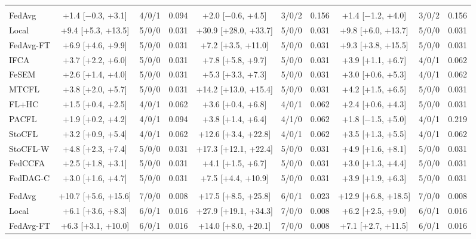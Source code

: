 {\begin{tabular}{l c c c c c c c c c}
\addlinespace
\multicolumn{10}{l}{\textit{(b) Realistic benchmarks}} \\
FedAvg & +1.4 [$-$0.3, +3.1] & 4/0/1 & 0.094 & +2.0 [$-$0.6, +4.5] & 3/0/2 & 0.156 & +1.4 [$-$1.2, +4.0] & 3/0/2 & 0.156 \\
Local & +9.4 [+5.3, +13.5] & 5/0/0 & 0.031 & +30.9 [+28.0, +33.7] & 5/0/0 & 0.031 & +9.8 [+6.0, +13.7] & 5/0/0 & 0.031 \\
FedAvg-FT & +6.9 [+4.6, +9.9] & 5/0/0 & 0.031 & +7.2 [+3.5, +11.0] & 5/0/0 & 0.031 & +9.3 [+3.8, +15.5] & 5/0/0 & 0.031 \\
IFCA & +3.7 [+2.2, +6.0] & 5/0/0 & 0.031 & +7.8 [+5.8, +9.7] & 5/0/0 & 0.031 & +3.9 [+1.1, +6.7] & 4/0/1 & 0.062 \\
FeSEM & +2.6 [+1.4, +4.0] & 5/0/0 & 0.031 & +5.3 [+3.3, +7.3] & 5/0/0 & 0.031 & +3.0 [+0.6, +5.3] & 4/0/1 & 0.062 \\
MTCFL & +3.8 [+2.0, +5.7] & 5/0/0 & 0.031 & +14.2 [+13.0, +15.4] & 5/0/0 & 0.031 & +4.2 [+1.5, +6.5] & 5/0/0 & 0.031 \\
FL+HC & +1.5 [+0.4, +2.5] & 4/0/1 & 0.062 & +3.6 [+0.4, +6.8] & 4/0/1 & 0.062 & +2.4 [+0.6, +4.3] & 5/0/0 & 0.031 \\
PACFL & +1.9 [+0.2, +4.2] & 4/0/1 & 0.094 & +3.8 [+1.4, +6.4] & 4/1/0 & 0.062 & +1.8 [$-$1.5, +5.0] & 4/0/1 & 0.219 \\
StoCFL & +3.2 [+0.9, +5.4] & 4/0/1 & 0.062 & +12.6 [+3.4, +22.8] & 4/0/1 & 0.062 & +3.5 [+1.3, +5.5] & 4/0/1 & 0.062 \\
StoCFL-W & +4.8 [+2.3, +7.4] & 5/0/0 & 0.031 & +17.3 [+12.1, +22.4] & 5/0/0 & 0.031 & +4.9 [+1.6, +8.1] & 5/0/0 & 0.031 \\
FedCCFA & +2.5 [+1.8, +3.1] & 5/0/0 & 0.031 & +4.1 [+1.5, +6.7] & 5/0/0 & 0.031 & +3.0 [+1.3, +4.4] & 5/0/0 & 0.031 \\
FedDAG-C & +3.0 [+1.6, +4.7] & 5/0/0 & 0.031 & +7.5 [+4.4, +10.9] & 5/0/0 & 0.031 & +3.9 [+1.9, +6.3] & 5/0/0 & 0.031 \\
\addlinespace
\multicolumn{10}{l}{\textit{(c) Additional benchmarks}} \\
FedAvg & +10.7 [+5.6, +15.6] & 7/0/0 & 0.008 & +17.5 [+8.5, +25.8] & 6/0/1 & 0.023 & +12.9 [+6.8, +18.5] & 7/0/0 & 0.008 \\
Local & +6.1 [+3.6, +8.3] & 6/0/1 & 0.016 & +27.9 [+19.1, +34.3] & 7/0/0 & 0.008 & +6.2 [+2.5, +9.0] & 6/0/1 & 0.016 \\
FedAvg-FT & +6.3 [+3.1, +10.0] & 6/0/1 & 0.016 & +14.0 [+8.0, +20.1] & 7/0/0 & 0.008 & +7.1 [+2.7, +11.5] & 6/0/1 & 0.016 \\

\end{tabular}}
